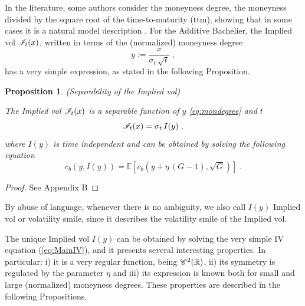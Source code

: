 \documentclass[12pt]{article}
\newtheorem{proposition}[theorem]{Proposition}
\theoremstyle{definition}
\theoremstyle{remark}
\numberwithin{theorem}{section}
\numberwithin{proposition}{section}
\numberwithin{lemma}{section}
\numberwithin{corollary}{section}
\numberwithin{definition}{section}
\numberwithin{remark}{section}
\numberwithin{example}{section}
\newcommand{\E}{\mathbb{E}}
\newcommand{\R}{\mathbb{R}}
\newcommand{\be}{\begin{equation}}
\newcommand{\en}{\end{equation}}
\begin{document}
In the literature, some authors
consider the 
moneyness degree, the moneyness divided by the square root of the time-to-maturity (ttm), 
showing that in some cases it is a natural model description  \citep{carr2003finite,medvedev}.
For the Additive Bachelier, the Implied vol ${\cal I}_t(x)$, written in terms of the (normalized) moneyness degree
\be
y := \frac{x}{\sigma_t  \, \sqrt{t}} \; ,
\label{eq:mondegree}
\en
has a very simple expression, as stated in the following Proposition.

\begin{proposition} {\rm (Separability of the Implied vol)}
\label{prop:IyTimeIndep} 

The Implied vol ${\cal I}_t(x)$ is a separable function of $y$ \eqref{eq:mondegree} and $t$
\be
\label{eq:ImpVolSeparability}
{\cal I}_t(x) = \sigma_t \, I(y) \; ,
\en
where 
${I}(y)$ %
is time independent and can be obtained by solving the
following equation
\be
\label{eq:MainIV}
 {c_b\left( y, {I}(y)\right)}  =  \E \left[ c_b\left(y+  \eta \, (G -1) , \sqrt{G}\right) \right]     \; .
\en
\end{proposition}
\begin{proof}
See Appendix B
\end{proof}


By abuse of language, whenever there is no ambiguity, we also call $I(y)$ Implied vol or volatility smile, 
since it describes the volatility smile of the Implied vol.

The unique Implied vol ${ I}({ y})$ can be obtained by solving the very simple IV equation (\ref{eq:MainIV}), and it presents several interesting properties.
In particular: i) it is a very regular function, being ${\cal C}^2 ( \R)$,  ii) its symmetry is regulated by the parameter $\eta$
and iii) its expression is known both for small and large (normalized) moneyness degrees.
These properties are described in the following Propositions.
\end{document}
